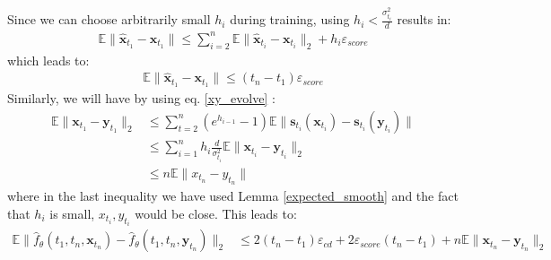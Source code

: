 \documentclass[11pt]{article}
\def\rvx{{\mathbf{x}}}
\def\rvy{{\mathbf{y}}}
\def\vs{{\bm{s}}}
\begin{document}

\noindent
Since we can choose arbitrarily small $h_i$ during training, using $h_i<\frac{\sigma^2_{t_i}}{d}$ results in:
\begin{align*}
     \mathbb{E}\|\hat{\rvx}_{t_1} - \rvx_{t_1}\| \leq \sum_{i=2}^n\mathbb{E}\|\hat{\rvx}_{t_i} - \rvx_{t_i}\|_2 + h_i\varepsilon_{score}
\end{align*}
which leads to:
\begin{align*}
    \mathbb{E}\|\hat{\rvx}_{t_1} - \rvx_{t_1}\| \leq (t_n-t_1)\varepsilon_{score}
\end{align*}
Similarly, we will have by using eq. \ref{xy_evolve} :
\begin{align*}
    \mathbb{E}\|\rvx_{t_1}-\rvy_{t_1}\|_2 &\leq \sum_{t=2}^n(e^{h_{i-1}}-1) \mathbb{E}\|\vs_{t_i}(\rvx_{t_i})-\vs_{t_i}(\rvy_{t_i})\| \\ &\leq \sum_{i=1}^{n}h_i\frac{d}{\sigma^2_{t_i}}\mathbb{E}\|\rvx_{t_i}-\rvy_{t_i}\|_2 \\
    &\leq n\mathbb{E}\|x_{t_n}-y_{t_n}\|
\end{align*}
where in the last inequality we have used Lemma \ref{expected_smooth} and the fact that $h_i$ is small, $x_{t_i}, y_{t_i}$ would be close. This leads to:
\begin{align*}
\mathbb{E}\|\hat{f}_\theta(t_1, t_n, \rvx_{t_n}) - \hat{f}_\theta(t_1, t_n, \rvy_{t_n})\|_2 
& \leq 2(t_n-t_1)\varepsilon_{cd} + 2\varepsilon_{score}(t_n-t_1)  + n\mathbb{E}\|\rvx_{t_n}-\rvy_{t_n}\|_2 
\end{align*}
\end{document}
